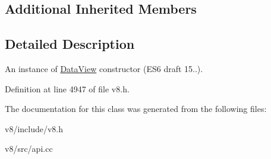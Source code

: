\subsection*{Additional Inherited Members}


\subsection{Detailed Description}
An instance of \mbox{\hyperlink{classv8_1_1DataView}{Data\+View}} constructor (E\+S6 draft 15..). 

Definition at line 4947 of file v8.\+h.



The documentation for this class was generated from the following files\+:\begin{DoxyCompactItemize}
\item 
v8/include/v8.\+h\item 
v8/src/api.\+cc\end{DoxyCompactItemize}
